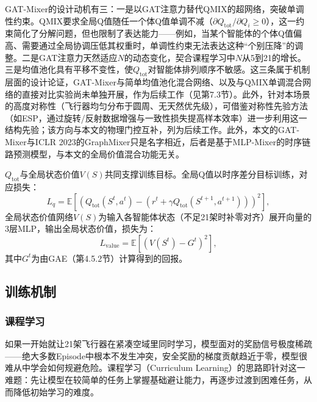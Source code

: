 \documentclass[12pt,a4paper,UTF8]{ctexart}
\begin{document}
GAT-Mixer的设计动机有三：一是以GAT注意力替代QMIX的超网络，突破单调性约束。QMIX要求全局Q值随任一个体Q值单调不减（$\partial Q_{\text{tot}}/\partial Q_i\geq0$），这一约束简化了分解问题，但也限制了表达能力——例如，当某个智能体的个体Q值偏高、需要通过全局协调压低其权重时，单调性约束无法表达这种“个别压降”的调整。二是GAT注意力天然适应$N$的动态变化，契合课程学习中$N$从5到21的增长。三是均值池化具有平移不变性，使$Q_{\text{tot}}$对智能体排列顺序不敏感。这三条属于机制层面的设计论证，GAT-Mixer与简单均值池化混合网络、以及与QMIX单调混合网络的直接对比实验尚未单独开展，作为后续工作（见第7.3节）。此外，针对本场景的高度对称性（飞行器均匀分布于圆周、无天然优先级），可借鉴对称性先验方法（如ESP\cite{ref57}，通过旋转/反射数据增强与一致性损失提高样本效率）进一步利用这一结构先验；该方向与本文的物理门控互补，列为后续工作。此外，本文的GAT-Mixer与ICLR 2023的GraphMixer\cite{ref28}只是名字相近，后者是基于MLP-Mixer的时序链路预测模型，与本文的全局价值混合功能无关。

$Q_{\text{tot}}$与全局状态价值$V(S)$共同支撑训练目标。全局Q值以时序差分目标训练，对应损失：
\begin{equation}
    L_{q} = \mathbb{E}\left[\left(Q_{\text{tot}}(S^t,a^t) - \left(r^t + \gamma Q_{\text{tot}}(S^{t+1},a^{t+1})\right)\right)^2\right],
    \label{eq:loss_q}
\end{equation}
全局状态价值网络$V(S)$为输入各智能体状态（不足21架时补零对齐）展开向量的3层MLP，输出全局状态价值，损失为：
\begin{equation}
    L_{\text{value}} = \mathbb{E}\left[\left(V(S^t) - G^t\right)^2\right],
    \label{eq:loss_value}
\end{equation}
其中$G^t$为由GAE（第4.5.2节）计算得到的回报。

\subsection{训练机制}

\subsubsection{课程学习}

如果一开始就让21架飞行器在紧凑空域里同时学习，模型面对的奖励信号极度稀疏——绝大多数Episode中根本不发生冲突，安全奖励的梯度贡献趋近于零，模型很难从中学会如何规避危险。课程学习（Curriculum Learning）\cite{ref39}的思路即针对这一难题：先让模型在较简单的任务上掌握基础避让能力，再逐步过渡到困难任务，从而降低初始学习的难度。
\end{document}
